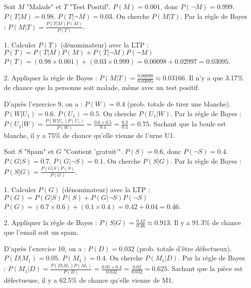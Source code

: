 \begin{correctionbox}
Soit $M$ "Malade" et $T$ "Test Positif".
$P(M) = 0.001$, donc $P(\neg M) = 0.999$.
$P(T|M) = 0.98$.
$P(T|\neg M) = 0.03$.
On cherche $P(M|T)$. Par la règle de Bayes : $P(M|T) = \frac{P(T|M)P(M)}{P(T)}$.

1.  Calculer $P(T)$ (dénominateur) avec la LTP :
    $P(T) = P(T|M)P(M) + P(T|\neg M)P(\neg M)$
    $P(T) = (0.98 \times 0.001) + (0.03 \times 0.999) = 0.00098 + 0.02997 = 0.03095$.

2.  Appliquer la règle de Bayes :
    $P(M|T) = \frac{0.00098}{0.03095} \approx 0.03166$.
    Il n'y a que 3.17\% de chance que la personne soit malade, même avec un test positif.
\end{correctionbox}

\begin{correctionbox}
D'après l'exercice 9, on a :
$P(W) = 0.4$ (prob. totale de tirer une blanche).
$P(W|U_1) = 0.6$.
$P(U_1) = 0.5$.
On cherche $P(U_1|W)$. Par la règle de Bayes :
$P(U_1|W) = \frac{P(W|U_1)P(U_1)}{P(W)} = \frac{0.6 \times 0.5}{0.4} = \frac{0.3}{0.4} = 0.75$.
Sachant que la boule est blanche, il y a 75\% de chance qu'elle vienne de l'urne U1.
\end{correctionbox}

\begin{correctionbox}
Soit $S$ "Spam" et $G$ "Contient 'gratuit'".
$P(S) = 0.6$, donc $P(\neg S) = 0.4$.
$P(G|S) = 0.7$.
$P(G|\neg S) = 0.1$.
On cherche $P(S|G)$. Par la règle de Bayes : $P(S|G) = \frac{P(G|S)P(S)}{P(G)}$.

1.  Calculer $P(G)$ (dénominateur) avec la LTP :
    $P(G) = P(G|S)P(S) + P(G|\neg S)P(\neg S)$
    $P(G) = (0.7 \times 0.6) + (0.1 \times 0.4) = 0.42 + 0.04 = 0.46$.

2.  Appliquer la règle de Bayes :
    $P(S|G) = \frac{0.42}{0.46} \approx 0.913$.
    Il y a 91.3\% de chance que l'email soit un spam.
\end{correctionbox}

\begin{correctionbox}
D'après l'exercice 10, on a :
$P(D) = 0.032$ (prob. totale d'être défectueux).
$P(D|M_1) = 0.05$.
$P(M_1) = 0.4$.
On cherche $P(M_1|D)$. Par la règle de Bayes :
$P(M_1|D) = \frac{P(D|M_1)P(M_1)}{P(D)} = \frac{0.05 \times 0.4}{0.032} = \frac{0.02}{0.032} = 0.625$.
Sachant que la pièce est défectueuse, il y a 62.5\% de chance qu'elle vienne de M1.
\end{correctionbox}

